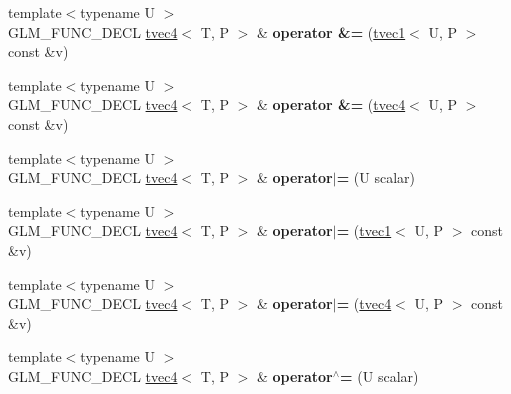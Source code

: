 \begin{DoxyCompactItemize}
{\footnotesize template$<$typename U $>$ }\\G\+L\+M\+\_\+\+F\+U\+N\+C\+\_\+\+D\+E\+CL \hyperlink{structglm_1_1tvec4}{tvec4}$<$ T, P $>$ \& {\bfseries operator \&=} (\hyperlink{structglm_1_1tvec1}{tvec1}$<$ U, P $>$ const \&v)
\item 
\mbox{\label{structglm_1_1tvec4_a2e3d5e97590f9f159dd2d59b86fcdf61}} 
{\footnotesize template$<$typename U $>$ }\\G\+L\+M\+\_\+\+F\+U\+N\+C\+\_\+\+D\+E\+CL \hyperlink{structglm_1_1tvec4}{tvec4}$<$ T, P $>$ \& {\bfseries operator \&=} (\hyperlink{structglm_1_1tvec4}{tvec4}$<$ U, P $>$ const \&v)
\item 
\mbox{\label{structglm_1_1tvec4_ad25c16e99c736f476341ce104743ea33}} 
{\footnotesize template$<$typename U $>$ }\\G\+L\+M\+\_\+\+F\+U\+N\+C\+\_\+\+D\+E\+CL \hyperlink{structglm_1_1tvec4}{tvec4}$<$ T, P $>$ \& {\bfseries operator$\vert$=} (U scalar)
\item 
\mbox{\label{structglm_1_1tvec4_a33c3ccecaa070fbab0ad4d3857ab084d}} 
{\footnotesize template$<$typename U $>$ }\\G\+L\+M\+\_\+\+F\+U\+N\+C\+\_\+\+D\+E\+CL \hyperlink{structglm_1_1tvec4}{tvec4}$<$ T, P $>$ \& {\bfseries operator$\vert$=} (\hyperlink{structglm_1_1tvec1}{tvec1}$<$ U, P $>$ const \&v)
\item 
\mbox{\label{structglm_1_1tvec4_acf72e48733651ac92f61ed70fe339a37}} 
{\footnotesize template$<$typename U $>$ }\\G\+L\+M\+\_\+\+F\+U\+N\+C\+\_\+\+D\+E\+CL \hyperlink{structglm_1_1tvec4}{tvec4}$<$ T, P $>$ \& {\bfseries operator$\vert$=} (\hyperlink{structglm_1_1tvec4}{tvec4}$<$ U, P $>$ const \&v)
\item 
\mbox{\label{structglm_1_1tvec4_a4e3c9f658334363b354a9d6865ad35d7}} 
{\footnotesize template$<$typename U $>$ }\\G\+L\+M\+\_\+\+F\+U\+N\+C\+\_\+\+D\+E\+CL \hyperlink{structglm_1_1tvec4}{tvec4}$<$ T, P $>$ \& {\bfseries operator$^\wedge$=} (U scalar)
\item 
\mbox{\label{structglm_1_1tvec4_a44b9249aabc9ae280d826ffe16b4b0dc}} 

\end{DoxyCompactItemize}
